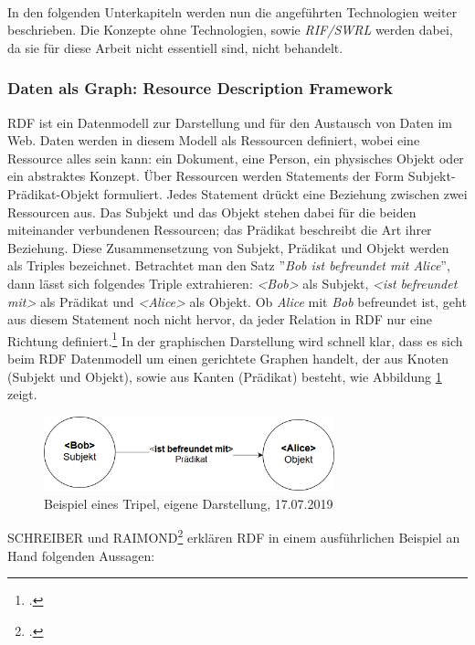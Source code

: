 \documentclass[12pt,a4paper]{article}
\begin{document}
\\
In den folgenden Unterkapiteln werden nun die angeführten Technologien weiter beschrieben. Die Konzepte ohne Technologien, sowie \textit{RIF/SWRL} werden dabei, da sie für diese Arbeit nicht essentiell sind, nicht behandelt.


\subsubsection{Daten als Graph: Resource Description Framework}

RDF ist ein Datenmodell zur Darstellung und für den Austausch von Daten im Web. Daten werden in diesem Modell als Ressourcen definiert, wobei eine Ressource alles sein kann: ein Dokument, eine Person, ein physisches Objekt oder ein abstraktes Konzept. Über Ressourcen werden Statements der Form Subjekt-Prädikat-Objekt formuliert. Jedes Statement drückt eine Beziehung zwischen zwei Ressourcen aus. Das Subjekt und das Objekt stehen dabei für die beiden miteinander verbundenen Ressourcen; das Prädikat beschreibt die Art ihrer Beziehung. Diese Zusammensetzung von Subjekt, Prädikat und Objekt werden als Triples bezeichnet. Betrachtet man den Satz ''\textit{Bob ist befreundet mit Alice}'', dann lässt sich folgendes Triple extrahieren: \textit{<Bob>} als Subjekt, \textit{<ist befreundet mit>} als Prädikat und \textit{<Alice>} als Objekt. Ob \textit{Alice} mit \textit{Bob} befreundet ist, geht aus diesem Statement noch nicht hervor, da jeder Relation in RDF nur eine Richtung definiert.\footcite[][S.16-21]{powers2003practical} In der graphischen Darstellung wird schnell klar, dass es sich beim RDF Datenmodell um einen gerichtete Graphen handelt, der aus Knoten (Subjekt und Objekt), sowie aus Kanten (Prädikat) besteht, wie Abbildung \ref{fig:triple} zeigt.
\begin{figure}[H]
  \centering
	\includegraphics[width=0.75\textwidth]{img/triple.png}  
    \caption[Beispiel eines Tripel]{Beispiel eines Tripel, eigene Darstellung, 17.07.2019}
  	\label{fig:triple}
\end{figure}
SCHREIBER und RAIMOND\footcite[][]{schreiber2014rdf} erklären RDF in einem ausführlichen Beispiel an Hand folgenden Aussagen:
\end{document}
